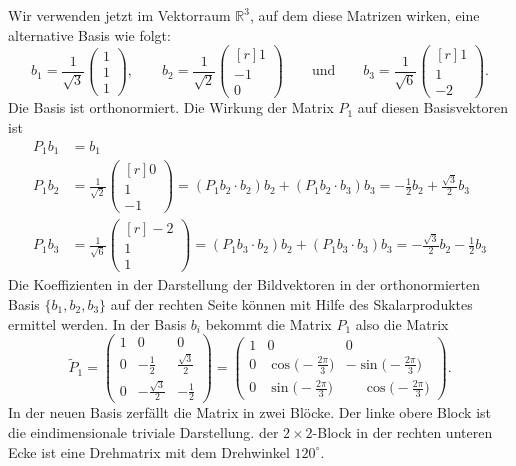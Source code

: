 \begin{beispiel}
Wir verwenden jetzt im Vektorraum $\mathbb{R}^3$, auf dem diese Matrizen
wirken, eine alternative Basis wie folgt:
\[
b_1
=
\frac{1}{\!\sqrt{3}}
\begin{pmatrix}1\\1\\1\end{pmatrix}
,
\qquad
b_2
=
\frac{1}{\!\sqrt{2}}
\begin{pmatrix*}[r]1 \\ -1 \\ 0\end{pmatrix*}
\qquad\text{und}\qquad
b_3
=
\frac{1}{\!\sqrt{6}}
\begin{pmatrix*}[r] 1\\1\\-2\end{pmatrix*}.
\]
Die Basis ist orthonormiert.
Die Wirkung der Matrix $P_1$ auf diesen Basisvektoren ist
\begin{align*}
P_1b_1
&=
b_1\\
P_1b_2
&=
\frac{1}{\!\sqrt{2}}
\begin{pmatrix*}[r]
0\\1\\-1
\end{pmatrix*}
=
(P_1b_2\cdot b_2) b_2
+
(P_1b_2\cdot b_3) b_3
=
-\frac{1}{2}
b_2
+
\frac{\sqrt{3}}{2}
b_3
\\
P_1b_3
&=
\frac{1}{\!\sqrt{6}}
\begin{pmatrix*}[r]
-2\\ 1\\1
\end{pmatrix*}
=
(P_1b_3\cdot b_2) b_2
+
(P_1b_3\cdot b_3) b_3
=
-\frac{\!\sqrt{3}}{2}
b_2
-
\frac{1}{2}
b_3
\end{align*}
Die Koeffizienten in der Darstellung der Bildvektoren in der
orthonormierten Basis $\{b_1,b_2,b_3\}$ auf der rechten Seite
können mit Hilfe des Skalarproduktes ermittel werden.
In der Basis $b_i$ bekommt die Matrix $P_1$ also die Matrix
\begin{equation}
\renewcommand{\arraystretch}{1.2}
\tilde{P}_1
=
\begin{pmatrix}
1&0&0\\
0&-\frac12 & \frac{\!\sqrt{3}}2\\
0&-\frac{\!\sqrt{3}}2&-\frac12
\end{pmatrix}
=
\begin{pmatrix}
1&0&0\\
0&\cos\bigl(-\frac{2\pi}{3}\bigr)& -\sin\bigl(-\frac{2\pi}{3}\bigr) \\
0&\sin\bigl(-\frac{2\pi}{3}\bigr)& \phantom{-}\cos\bigl(-\frac{2\pi}{3}\bigr)
\end{pmatrix}.
\label{buch:gruppen:darstellung:bsp:c3:blockform}
\end{equation}
In der neuen Basis zerfällt die Matrix in zwei Blöcke.
Der linke obere Block ist die eindimensionale triviale Darstellung.
der $2\times 2$-Block in der rechten unteren Ecke ist eine Drehmatrix mit
dem Drehwinkel $120^\circ$.


\end{beispiel}
